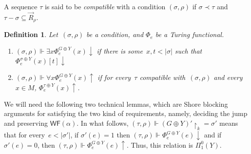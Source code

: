 \documentclass{article}
\numberwithin{theorem}{section}
\newtheorem{lemma}[theorem]{Lemma}
\newtheorem{definition}[theorem]{Definition}
\newcommand{\WF}{\mathsf{WF}}
\newcommand{\uh}[0]{{\upharpoonright}}
\begin{document}
A sequence $\tau$ is said to be \emph{compatible} with a condition $(\sigma,\rho)$ if $\sigma \prec \tau$ and  $\tau - \sigma \subseteq \vec{R}_{\rho}$.

\begin{definition}
Let~$(\sigma, \rho)$ be a condition, and $\Phi_e$ be a Turing functional.
\begin{enumerate}
    \item[1.] $(\sigma, \rho) \Vdash \exists x \Phi^{G \oplus Y}_e(x)\downarrow$ if there is some~$x, t < |\sigma|$ such that $\Phi^{\sigma \oplus Y}_e(x)[t]\downarrow$
    \item[2.] $(\sigma, \rho) \Vdash \forall x \Phi^{G \oplus Y}_e(x)\uparrow$ if for every~$\tau$ compatible with~$(\sigma, \rho)$ and every~$x \in M$, $\Phi^{\tau \oplus Y}_e(x)\uparrow$.
\end{enumerate}
\end{definition}

We will need the following two technical lemmas, which are Shore blocking arguments for satisfying the two kind of requirements, namely, deciding the jump and preserving $\WF(\alpha)$. In what follows, $(\tau, \rho) \Vdash (G \oplus Y)' \uh_k = \sigma'$ means that for every~$e < |\sigma'|$, if $\sigma'(e) = 1$ then $(\tau, \rho) \Vdash \Phi^{G \oplus Y}_e(e)\downarrow$ and if $\sigma'(e) = 0$, then $(\tau, \rho) \Vdash \Phi^{G \oplus Y}_e(e)\uparrow$. Thus, this relation is $\Pi^0_1(Y)$.

\end{document}
